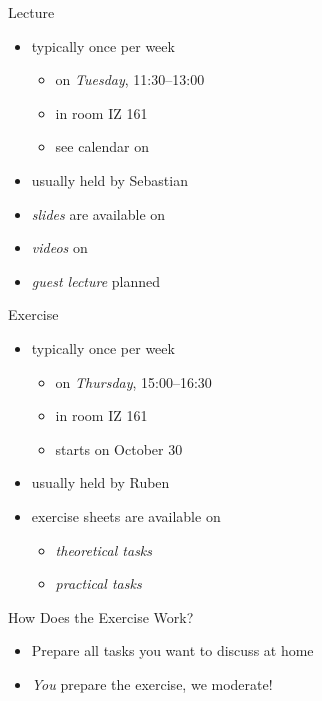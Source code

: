 \begin{frame}{\myframetitle}
	\begin{fancycolumns}
		\begin{definition}{Lecture}
			\begin{itemize}
				\item typically once per week
				\begin{itemize}
					\item on \emph{Tuesday}, 11:30--13:00
					\item in room IZ 161
					\item see calendar on \StudIP
				\end{itemize}
				\item usually held by Sebastian
				\item \emph{slides} are available on \StudIP
				\item \emph{videos} on \Youtube
				\item \emph{guest lecture} planned
			\end{itemize}
		\end{definition}
	\nextcolumn
		\begin{example}{Exercise}
			\begin{itemize}
				\item typically once per week
				\begin{itemize}
					\item on \emph{Thursday}, 15:00--16:30
					\item in room IZ 161
					\item starts on October 30
				\end{itemize}
				\item usually held by Ruben
				\item exercise sheets are available on \StudIP
				\begin{itemize}
					\item \emph{theoretical tasks}
					\item \emph{practical tasks}
				\end{itemize}
			\end{itemize}
		\end{example}
		\begin{note}{How Does the Exercise Work?}
			\begin{itemize}
				\item Prepare all tasks you want to discuss at home
				\item \emph{You} prepare the exercise, we moderate!
			\end{itemize}
		\end{note}
	\end{fancycolumns}
\end{frame}

